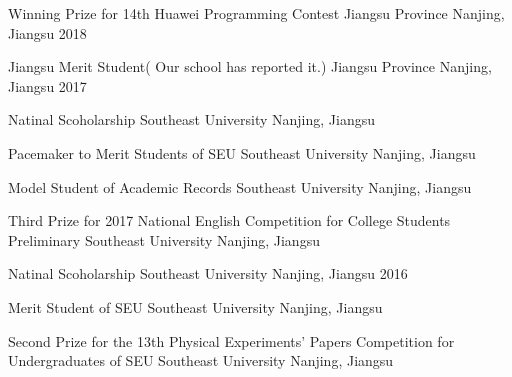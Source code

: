 \vspace{-6.0mm}


\vspace{-1.5mm}
\begin{cvhonors}
\cvhonor
{Winning Prize for 14th Huawei Programming Contest} %
{Jiangsu Province} %
{Nanjing, Jiangsu} %
{2018} %

\cvhonor
{Jiangsu Merit Student( Our school has reported it.)} %
{Jiangsu Province} %
{Nanjing, Jiangsu} %
{2017} %

\cvhonor
{Natinal Scoholarship} %
{Southeast University} %
{Nanjing, Jiangsu} %
{} %

\cvhonor
{Pacemaker to Merit Students of SEU } %
{Southeast University} %
{Nanjing, Jiangsu} %
{} %


\cvhonor
{Model Student of Academic Records} %
{Southeast University} %
{Nanjing, Jiangsu} %
{} %

\cvhonor
{Third Prize for 2017 National English Competition for College Students Preliminary}
{Southeast University}
{Nanjing, Jiangsu}
{}


\cvhonor
{Natinal Scoholarship} %
{Southeast University} %
{Nanjing, Jiangsu} %
{2016} %


\cvhonor
{Merit Student of SEU} %
{Southeast University} %
{Nanjing, Jiangsu} %
{} %


\cvhonor
{Second Prize for the 13th Physical Experiments' Papers Competition for Undergraduates of SEU}
{Southeast University}
{Nanjing, Jiangsu}
{}
\end{cvhonors}